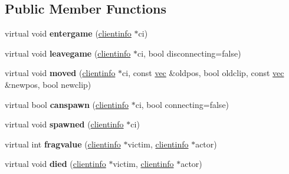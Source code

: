 \subsection*{Public Member Functions}
\begin{DoxyCompactItemize}
\item 
\mbox{\label{structserver_1_1servmode_a56c5b58eb16369b1e4ea203453e8ab29}} 
virtual void {\bfseries entergame} (\hyperlink{structserver_1_1clientinfo}{clientinfo} $\ast$ci)
\item 
\mbox{\label{structserver_1_1servmode_ac0919315170eeba9c561131e824214de}} 
virtual void {\bfseries leavegame} (\hyperlink{structserver_1_1clientinfo}{clientinfo} $\ast$ci, bool disconnecting=false)
\item 
\mbox{\label{structserver_1_1servmode_a43dcd470aa291cf13f704f2629bb05e4}} 
virtual void {\bfseries moved} (\hyperlink{structserver_1_1clientinfo}{clientinfo} $\ast$ci, const \hyperlink{structvec}{vec} \&oldpos, bool oldclip, const \hyperlink{structvec}{vec} \&newpos, bool newclip)
\item 
\mbox{\label{structserver_1_1servmode_a53ad2be2818b38cd1f0a321ae5951dbc}} 
virtual bool {\bfseries canspawn} (\hyperlink{structserver_1_1clientinfo}{clientinfo} $\ast$ci, bool connecting=false)
\item 
\mbox{\label{structserver_1_1servmode_ac6ed3f41f5e10437809d16e7d139593f}} 
virtual void {\bfseries spawned} (\hyperlink{structserver_1_1clientinfo}{clientinfo} $\ast$ci)
\item 
\mbox{\label{structserver_1_1servmode_a068cef94c895a4abfd58ac5f16f59fe0}} 
virtual int {\bfseries fragvalue} (\hyperlink{structserver_1_1clientinfo}{clientinfo} $\ast$victim, \hyperlink{structserver_1_1clientinfo}{clientinfo} $\ast$actor)
\item 
\mbox{\label{structserver_1_1servmode_a3ec098da25cfb56c7b7963bbfb47074d}} 
virtual void {\bfseries died} (\hyperlink{structserver_1_1clientinfo}{clientinfo} $\ast$victim, \hyperlink{structserver_1_1clientinfo}{clientinfo} $\ast$actor)
\item 

\end{DoxyCompactItemize}

